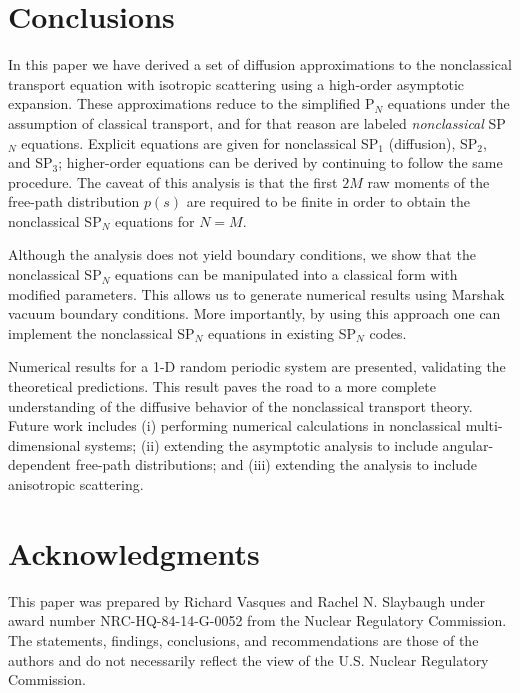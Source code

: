\documentclass{anstrans}
\begin{document}
\section{Conclusions}
In this paper we have derived a set of diffusion approximations to the nonclassical transport equation with isotropic scattering using a high-order asymptotic expansion.
These approximations reduce to the simplified P$_N$ equations under the assumption of classical transport, and for that reason are labeled \textit{nonclassical} SP$_N$ equations.
Explicit equations are given for nonclassical SP$_1$ (diffusion), SP$_2$, and SP$_3$; higher-order equations can be derived by continuing to follow the same procedure.
The caveat of this analysis is that the first $2M$ raw moments of the free-path distribution $p(s)$ are required to be finite in order to obtain the nonclassical SP$_N$ equations for $N=M$.

Although the analysis does not yield boundary conditions, we show that the nonclassical SP$_N$ equations can be manipulated into a classical form with modified parameters.
This allows us to generate numerical results using Marshak vacuum boundary conditions.
More importantly, by using this approach one can implement the nonclassical SP$_N$ equations in existing SP$_N$ codes.

Numerical results for a 1-D random periodic system are presented, validating the theoretical predictions.
This result paves the road to a more complete understanding of the diffusive behavior of the nonclassical transport theory.
Future work includes (i) performing numerical calculations in nonclassical multi-dimensional systems; (ii) extending the asymptotic analysis to include angular-dependent free-path distributions; and (iii) extending the analysis to include anisotropic scattering.

\section{Acknowledgments}
This paper was prepared by Richard Vasques and Rachel N. Slaybaugh under award number NRC-HQ-84-14-G-0052 from the Nuclear Regulatory Commission.
The statements, findings, conclusions, and recommendations are those of the authors and do not necessarily reflect the view of the U.S. Nuclear Regulatory Commission.



\end{document}
